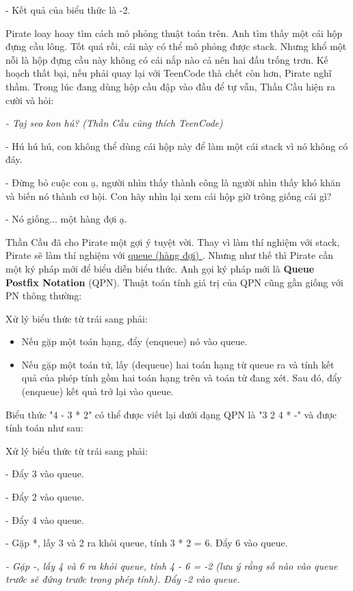 - Kết quả của biểu thức là -2.

   Pirate loay hoay tìm cách mô phỏng thuật toán trên. Anh tìm thấy một cái hộp đựng cầu lông. Tốt quá rồi, cái này có thể mô phỏng được stack. Nhưng khổ một nỗi là hộp đựng cầu này không có cái nắp nào cả nên hai đầu trống trơn. Kế hoạch thất bại, nếu phải quay lại với TeenCode thà chết còn hơn, Pirate nghĩ thầm. Trong lúc đang dùng hộp cầu đập vào đầu để tự vẫn, Thần Cầu hiện ra cười và hỏi:  

\emph{    - Tạj seo kon hú? (Thần Cầu cũng thích TeenCode)    
\\}

- Hú hú hú, con không thể dùng cái hộp này để làm một cái stack vì nó không có đáy.

- Đừng bỏ cuộc con ạ, người nhìn thấy thành công là người nhìn thấy khó khăn và biến nó thành cơ hội. Con hãy nhìn lại xem cái hộp giờ trông giống cái gì?

- Nó giống... một hàng đợi ạ.

   Thần Cầu đã cho Pirate một gợi ý tuyệt vời. Thay vì làm thí nghiệm với stack, Pirate sẽ làm thí nghiệm với   \href{http://www.cosc.canterbury.ac.nz/mukundan/dsal/QueueAppl.html}{    queue (hàng đợi)   }   . Nhưng như thế thì Pirate cần một ký pháp mới để biểu diễn biểu thức. Anh gọi ký pháp mới là   \textbf{    Queue Postfix Notation   }   (QPN). Thuật toán tính giá trị của QPN cũng gần giống với PN thông thường:  

Xử lý biểu thức từ trái sang phải:
\begin{itemize}
	\item Nếu gặp một toán hạng, đẩy (enqueue) nó vào queue.
	\item Nếu gặp một toán tử, lấy (dequeue) hai toán hạng từ queue ra và tính kết  quả của phép tính gồm hai toán hạng trên và toán tử đang xét. Sau đó,  đẩy (enqueue) kết quả trở lại vào queue.
\end{itemize}

   Biểu thức "4 - 3 * 2" có thể được viết lại dưới dạng QPN là "3 2 4 * -" và được tính toán như sau:  

    Xử lý biểu thức từ trái sang phải:   

- Đẩy 3 vào queue.

- Đẩy 2 vào queue.

- Đẩy 4 vào queue.

- Gặp *, lấy 3 và 2 ra khỏi queue, tính 3 * 2 = 6. Đẩy 6 vào queue.

\emph{    - Gặp -, lấy 4 và 6 ra khỏi queue, tính 4 - 6 = -2 (lưu ý rằng số nào vào queue trước sẽ đứng trước trong phép tính). Đẩy -2 vào queue.    
\\}

